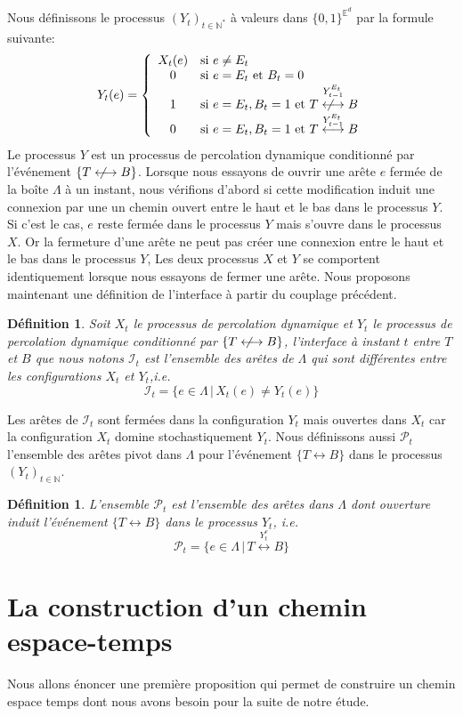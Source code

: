 \documentclass[titlepage,a4paper,12pt]{article}
\newcounter{def}
\newcounter{th}
\newcounter{propo}
\newtheorem{defi}[def]{Définition}
\newcommand{\nlongleftrightarrow}{\longleftrightarrow \kern-15pt\not \kern15pt}
\begin{document}
Nous définissons le processus $(Y_t)_{t\in\mathbb{N}^*}$ à valeurs dans $\{0,1\}^{\mathbb{E}^d}$ par la formule suivante:
$$ Y_t(e) = \left\lbrace \begin{array}{cl}
X_t(e) & \text{si }e \neq E_t\\
0 &\text{si } e = E_t\text{ et } B_t = 0\\
1 & \text{si } e=E_t, B_t = 1 \text{ et } T\overset{Y_{t-1}^{E_t}}{\nlongleftrightarrow} B\\
0 & \text{si } e=E_t, B_t = 1 \text{ et } T\overset{Y_{t-1}^{E_t}}{\longleftrightarrow} B
\end{array} \right.
$$
Le processus $Y$ est un processus de percolation dynamique conditionné par l'événement $\{T\nlongleftrightarrow B\}$. Lorsque nous essayons de ouvrir une arête $e$ fermée de la boîte $\Lambda$ à un instant, nous vérifions d'abord si cette modification induit une connexion par une un chemin ouvert entre le haut et le bas dans le processus $Y$. Si c'est le cas, $e$ reste fermée dans le processus $Y$ mais s'ouvre dans le processus $X$. Or la fermeture d'une arête ne peut pas créer une connexion entre le haut et le bas dans le processus $Y$, Les deux processus $X$ et $Y$ se comportent identiquement lorsque nous essayons de fermer une arête.
Nous proposons maintenant une définition de l'interface à partir du couplage précédent.
\begin{defi} Soit $X_t$ le processus de percolation dynamique et $Y_t$ le processus de percolation dynamique conditionné par $\{T\nlongleftrightarrow B\}$, l'interface à instant $t$ entre $T$ et $B$ que nous notons $\mathcal{I}_t$ est l'ensemble des arêtes de $\Lambda$ qui sont différentes entre les configurations $X_t$ et $Y_t$,i.e.
$$ \mathcal{I}_t = \big\{e\in\Lambda \,|\, X_t(e) \neq Y_t(e)\big\}
$$
\end{defi}
Les arêtes de $\mathcal{I}_t$ sont fermées dans la configuration $Y_t$ mais ouvertes dans $X_t$ car la configuration $X_t$ domine stochastiquement $Y_t$.
Nous définissons aussi $\mathcal{P}_t$ l'ensemble des arêtes pivot dans $\Lambda$ pour l'événement $\{T\longleftrightarrow B\}$ dans le processus $(Y_t)_{t\in \mathbb{N}}$. 
\begin{defi} L'ensemble $\mathcal{P}_t$ est l'ensemble des arêtes dans $\Lambda$ dont ouverture induit l'événement $\{T\longleftrightarrow B\}$ dans le processus $Y_t$, i.e.
$$\mathcal{P}_t = \big\{ e\in\Lambda \,|\, T\overset{Y_t^e}{\longleftrightarrow} B\big\}
$$
\end{defi}
\section{La construction d'un chemin espace-temps}
Nous allons énoncer une première proposition qui permet de construire un chemin espace temps dont nous avons besoin pour la suite de notre étude.
\end{document}
